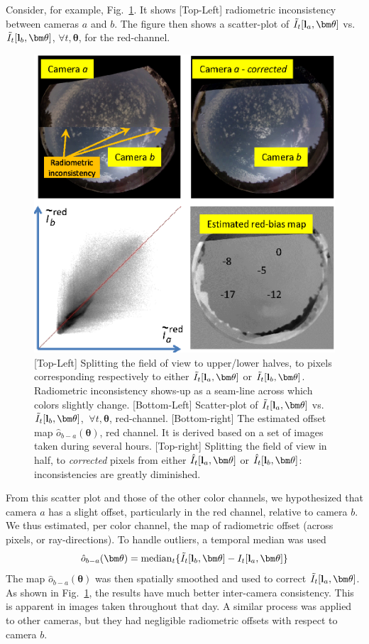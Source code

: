 \documentclass[runningheads]{llncs}
\begin{document}
Consider, for example, Fig.~\ref{fig:calibration}. It shows [Top-Left] radiometric inconsistency between cameras $a$ and $b$. The figure then shows a scatter-plot of
$\tilde I_t[{\bf l}_a,{\bm \theta}]$ vs.~$\tilde I_t[{\bf l}_{b},{\bm \theta}]$, $\forall t,{\bm \theta}$, for the red-channel.
\begin{figure}[t!]
\begin{center}
   \includegraphics[width=0.5\linewidth]{figures/bias1a.eps}
\end{center}
   \vspace{-0.6cm}
   \caption{[Top-Left] Splitting the field of view to upper/lower halves, to pixels corresponding 
   respectively to either $\tilde I_t[{\bf l}_a,{\bm \theta}]$  or $\tilde I_t[{\bf l}_{b},{\bm \theta}]$. Radiometric inconsistency
   shows-up as a seam-line across which colors slightly change. [Bottom-Left] Scatter-plot of
   $\tilde I_t[{\bf l}_a,{\bm \theta}]$ vs.~$\tilde I_t[{\bf l}_{b},{\bm \theta}]$, $~\forall t,{\bm \theta}$, red-channel. [Bottom-right] The estimated offset map ${\hat o}_{b-a}({\bm \theta})$, red channel. It is derived based on a set of images taken during several hours.
   [Top-right] Splitting the field of view in half, to {\em corrected} pixels from either
   $\hat I_t[{\bf l}_a,{\bm \theta}]$  or $\hat I_t[{\bf l}_{b},{\bm \theta}]$: inconsistencies are greatly
   diminished.
   }
\label{fig:calibration}
\end{figure}
From this scatter plot and those of the other color channels, we hypothesized that camera $a$ has a slight offset, particularly in the red channel, relative to camera $b$. We thus estimated, per color channel, the map of radiometric offset (across pixels, or ray-directions).
To handle outliers, a temporal median was used
\begin{equation}
 {\hat o}_{b-a}({\bm \theta})=
  {\rm median}_{t} \{\tilde I_t[{\bf l}_b,{\bm \theta}]-I_t[{\bf l}_a,{\bm \theta}]\}
 \label{eq:hato}
\end{equation}
The map ${\hat o}_{b-a}({\bm \theta})$ was then spatially smoothed and used to correct $\tilde I_t[{\bf l}_a,{\bm \theta}]$. As shown in Fig.~\ref{fig:calibration}, the results have much better inter-camera consistency. This is apparent in images taken throughout that day. A similar process was applied to other cameras, but they had negligible radiometric offsets with respect to camera $b$. 
\end{document}
